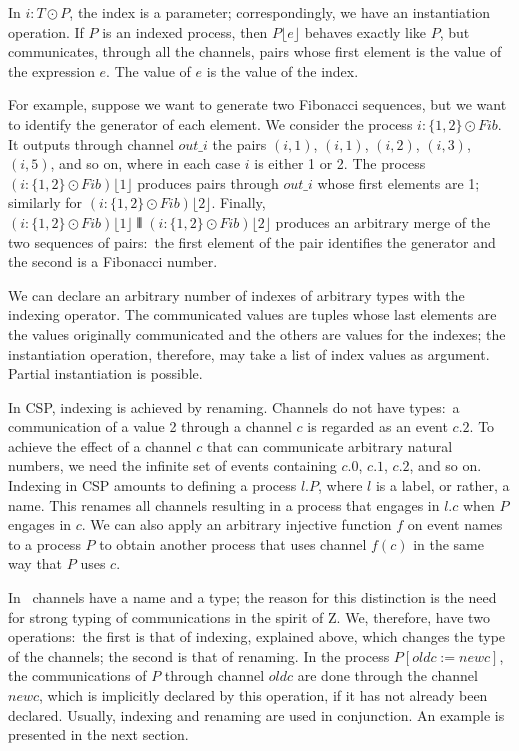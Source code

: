 \documentclass{article}
\begin{document}
In $i: T \odot P$, the index is a parameter; correspondingly, we have
an instantiation operation.  If $P$ is an indexed process, then
$P\lfloor e\rfloor$ behaves exactly like $P$, but communicates,
through all the channels, pairs whose first element is the value of
the expression $e$.  The value of $e$ is the value of the index.

For example, suppose we want to generate two Fibonacci sequences, but
we want to identify the generator of each element.  We consider the
process $i: \{ 1,2 \} \odot Fib$.  It outputs through channel $out\_i$
the pairs $(i,1)$, $(i,1)$, $(i,2)$, $(i,3)$, $(i,5)$, and so on,
where in each case $i$ is either 1 or 2.  The process $(i: \{ 1,2 \}
\odot Fib)\lfloor 1\rfloor$ produces pairs through $out\_i$ whose
first elements are 1; similarly for $(i: \{ 1,2 \} \odot Fib)\lfloor
2\rfloor$.  Finally, $(i: \{ 1,2 \} \odot Fib)\lfloor 1\rfloor
\interleave (i: \{ 1,2 \} \odot Fib)\lfloor 2\rfloor$ produces an
arbitrary merge of the two sequences of pairs:~the first element of
the pair identifies the generator and the second is a Fibonacci
number.

We can declare an arbitrary number of indexes of arbitrary types with
the indexing operator.  The communicated values are tuples whose last
elements are the values originally communicated and the others are
values for the indexes; the instantiation operation, therefore, may
take a list of index values as argument.  Partial instantiation is
possible.

In CSP, indexing is achieved by renaming.  Channels do not have
types:~a communication of a value 2 through a channel $c$ is regarded
as an event $c.2$.  To achieve the effect of a channel $c$ that can
communicate arbitrary natural numbers, we need the infinite set of
events containing $c.0$, $c.1$, $ c.2$, and so on.  Indexing in CSP
amounts to defining a process $l.P$, where $l$ is a label, or rather,
a name.  This renames all channels resulting in a process that engages
in $l.c$ when $P$ engages in $c$.  We can also apply an arbitrary
injective function $f$ on event names to a process $P $ to obtain
another process that uses channel $f(c)$ in the same way that $P$ uses
$c$.

In \Circus\ channels have a name and a type; the reason for this
distinction is the need for strong typing of communications in the
spirit of Z.  We, therefore, have two operations:~the first is that of
indexing, explained above, which changes the type of the channels; the
second is that of renaming.  In the process $P[oldc := newc]$, the
communications of $P$ through channel $oldc$ are done through the
channel $newc$, which is implicitly declared by this operation, if it
has not already been declared.  Usually, indexing and renaming are
used in conjunction.  An example is presented in the next section.
\end{document}
